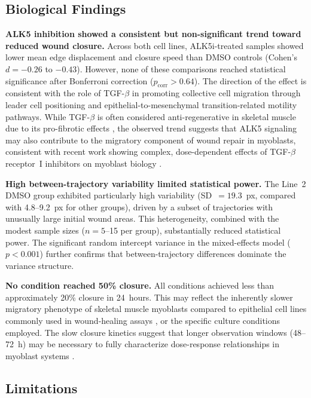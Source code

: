 \subsection{Biological Findings}

\textbf{ALK5 inhibition showed a consistent but non-significant trend toward reduced wound closure.} Across both cell lines, ALK5i-treated samples showed lower mean edge displacement and closure speed than DMSO controls (Cohen's $d = -0.26$ to $-0.43$). However, none of these comparisons reached statistical significance after Bonferroni correction ($p_\text{corr} > 0.64$). The direction of the effect is consistent with the role of TGF-$\beta$ in promoting collective cell migration through leader cell positioning \citep{Vishwakarma2014} and epithelial-to-mesenchymal transition-related motility pathways. While TGF-$\beta$ is often considered anti-regenerative in skeletal muscle due to its pro-fibrotic effects \citep{Li2004,Ceco2013,Delaney2017}, the observed trend suggests that ALK5 signaling may also contribute to the migratory component of wound repair in myoblasts, consistent with recent work showing complex, dose-dependent effects of TGF-$\beta$ receptor~I inhibitors on myoblast biology \citep{WeissA2025,WeissB2025}.

\textbf{High between-trajectory variability limited statistical power.} The Line~2 DMSO group exhibited particularly high variability (SD~$= 19.3$~px, compared with 4.8--9.2~px for other groups), driven by a subset of trajectories with unusually large initial wound areas. This heterogeneity, combined with the modest sample sizes ($n = 5$--15 per group), substantially reduced statistical power. The significant random intercept variance in the mixed-effects model ($p < 0.001$) further confirms that between-trajectory differences dominate the variance structure.

\textbf{No condition reached 50\% closure.} All conditions achieved less than approximately 20\% closure in 24~hours. This may reflect the inherently slower migratory phenotype of skeletal muscle myoblasts compared to epithelial cell lines commonly used in wound-healing assays \citep{Goetsch2011,Goetsch2013}, or the specific culture conditions employed. The slow closure kinetics suggest that longer observation windows (48--72~h) may be necessary to fully characterize dose-response relationships in myoblast systems \citep{Topman2021}.

\subsection{Limitations}


